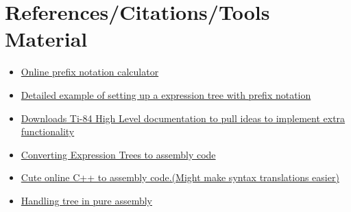\documentclass[a4paper,10pt]{article}
\begin{document}
\section*{References/Citations/Tools Material}
\label{mathrefs}
\begin{itemize}

    \item \href{http://scanftree.com/Data_Structure/prefix-postfix-infix-online-converter}{Online prefix notation calculator}
    
    \item \href{https://cs.nyu.edu/courses/fall11/CSCI-GA.1133-001/rct257_files/Expression_Trees.pdf}{Detailed example of setting up a expression tree with prefix notation}
    
    \item \href{https://education.ti.com/-/media/6CC4C5AED5004F808892046AD33D4A35}{Downloads Ti-84 High Level documentation to pull ideas to implement extra functionality}
    
    \item \href{https://sites.google.com/site/arch1utep/home/course_outline/translating-complex-expressions-into-assembly-language-using-expression-trees}{Converting Expression Trees to assembly code}
    
    \item \href{https://godbolt.org/}{Cute online C++ to assembly code.(Might make syntax translations easier)}
    
    \item\href{https://www.cs.usfca.edu/~galles/compilerdesign/x86.pdf}{Handling tree in pure assembly}   
    
\end{itemize} 
\end{document}
